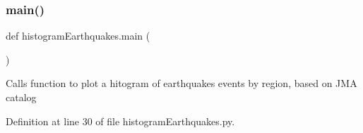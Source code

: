 \mbox{\label{namespacehistogram_earthquakes_a212707dd671ef5dee3990d80d54f337d}} 
\subsubsection{\texorpdfstring{main()}{main()}}
{\footnotesize\ttfamily def histogram\+Earthquakes.\+main (\begin{DoxyParamCaption}{ }\end{DoxyParamCaption})}

\begin{DoxyVerb}Calls function to plot a hitogram of earthquakes events by region, based on JMA catalog
\end{DoxyVerb}
 

Definition at line 30 of file histogram\+Earthquakes.\+py.

